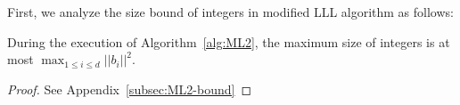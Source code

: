   

First, we analyze the size bound of integers in modified LLL algorithm as follows:

\begin{lemma}
\label{lem:ML2-bound}
During the execution of Algorithm~\ref{alg:ML2}, the maximum size of integers is at most $\max_{1\le i\le d} || b_i ||^2$.
\end{lemma}

\begin{proof}
See Appendix~\ref{subsec:ML2-bound}
\end{proof}

